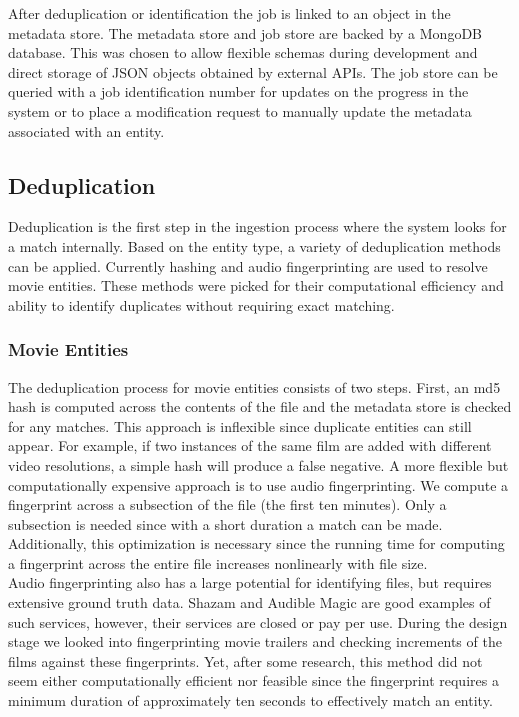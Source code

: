 \documentclass[paper=a4, fontsize=11pt]{scrartcl} %
\numberwithin{equation}{section} %
\numberwithin{figure}{section} %
\numberwithin{table}{section} %
\begin{document}
After deduplication or identification the job is linked to an object in the metadata store. The metadata store and job store are backed by a MongoDB database. This was chosen to allow flexible schemas during development and direct storage of JSON objects obtained by external APIs. The job store can be queried with a job identification number for updates on the progress in the system or to place a modification request to manually update the metadata associated with an entity. \\


\subsection{Deduplication}
\label{sec:deduplication}
Deduplication is the first step in the ingestion process where the system looks for a match internally. Based on the entity type, a variety of deduplication methods can be applied. Currently hashing and audio fingerprinting are used to resolve movie entities. These methods were picked for their computational efficiency and ability to identify duplicates without requiring exact matching. \\

\subsubsection{Movie Entities}
\label{sec:dedup-movie-entities}
The deduplication process for movie entities consists of two steps. First, an md5 hash is computed across the contents of the file and the metadata store is checked for any matches. This approach is inflexible since duplicate entities can still appear. For example, if two instances of the same film are added with different video resolutions, a simple hash will produce a false negative. A more flexible but computationally expensive approach is to use audio fingerprinting. We compute a fingerprint across a subsection of the file (the first ten minutes). Only a subsection is needed since with a short duration a match can be made. Additionally, this optimization is necessary since the running time for computing a fingerprint across the entire file increases nonlinearly with file size. \\

Audio fingerprinting also has a large potential for identifying files, but requires extensive ground truth data. Shazam and Audible Magic are good examples of such services, however, their services are closed or pay per use. During the design stage we looked into fingerprinting movie trailers and checking increments of the films against these fingerprints. Yet, after some research, this method did not seem either computationally efficient nor feasible since the fingerprint requires a minimum duration of approximately ten seconds to effectively match an entity. \\
\end{document}
